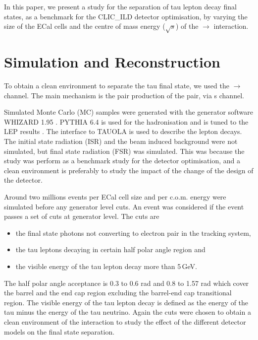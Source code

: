 \documentclass[a4paper,11pt]{article}
\newcommand{\rootS}{\ensuremath{\sqrt{s}}}
\begin{document}
In this paper, we present a study for the separation of tau lepton decay final states, as a benchmark for the CLIC\_ILD detector optimisation, by varying the size of the ECal cells and the centre of mass  energy (\rootS) of the \Pem\Pep $\to$ \PGtm\PGtp interaction.


\section{Simulation and Reconstruction}

To obtain a clean environment to separate the tau final state, we used the  \Pem\Pep $\to$ \PGtm\PGtp channel. The main mechanism is the pair production of the \Ptau pair, via s channel. 

Simulated Monte Carlo (MC) samples were generated with the generator software WHIZARD 1.95 \cite{whizard}. PYTHIA 6.4 \cite{Sjostrand:1995iq} is used for the hadronisation and is tuned to the LEP results \cite{}. The interface to TAUOLA \cite{Jadach:1993hs} is used to describe the \PGt lepton decays. The initial state radiation (ISR) and the beam induced background were not simulated, but final state radiation (FSR) was simulated. This was because the study was perform as a benchmark study for the detector optimisation, and a clean environment is preferably to study the impact of the change of the design of the detector.

Around two millions events per ECal cell size and per c.o.m. energy were simulated before any generator level cuts. An event was considered if the event passes a set of cuts at generator level. The cuts are 
\begin{itemize}
 \item the final state photons not converting to electron pair in the tracking system,
  \item the tau leptons decaying in certain half polar angle region and
  \item the visible energy of the tau lepton decay more than 5\,GeV.
\end{itemize}

The half polar angle acceptance is 0.3 to 0.6 rad and 0.8 to 1.57 rad which cover the barrel and the end cap region excluding the barrel-end cap transitional region. The visible energy of the tau lepton decay is defined as the energy of the tau minus the energy of the tau neutrino. Again the cuts were chosen to obtain a clean environment of the interaction to study the effect of the different detector models on the \Ptau final state separation.
\end{document}
